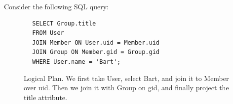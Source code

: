     \begin{example}
      \label{ex:query-plans}
      Consider the following SQL query:
      \begin{lstlisting}
        SELECT Group.title
        FROM User
        JOIN Member ON User.uid = Member.uid
        JOIN Group ON Member.gid = Group.gid
        WHERE User.name = 'Bart';
      \end{lstlisting}

      \begin{figure}[H]
        \centering 
        \caption{Logical Plan. We first take User, select Bart, and join it to Member over uid. Then we join it with Group on gid, and finally project the title attribute.} 
        \label{fig:logical_plan}
      \end{figure}


\end{example}
